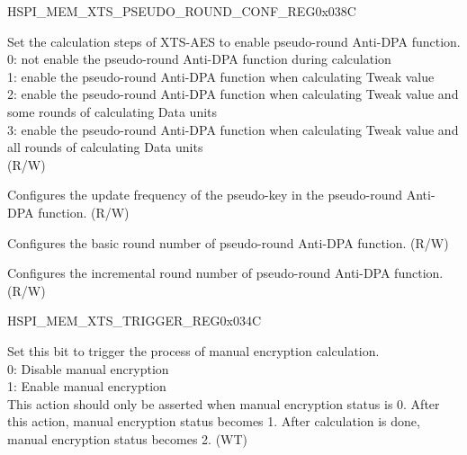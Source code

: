 \begin{register}{H}{SPI\_MEM\_XTS\_PSEUDO\_ROUND\_CONF\_REG}{0x038C}\label{regdesc:SPIMEMXTSPSEUDOROUNDCONFREG}
%
%
%
%
%
\regnewline%
\begin{regdesc}\begin{reglist}
\label{fielddesc:SPIMEMMODEPSEUDO}\item [SPI\_MEM\_MODE\_PSEUDO] Set the calculation steps of XTS-AES to enable pseudo-round Anti-DPA function. \\
0: not enable the pseudo-round Anti-DPA function during calculation\\
1: enable the pseudo-round Anti-DPA function when calculating Tweak value\\
2: enable the pseudo-round Anti-DPA function when calculating Tweak value and some rounds of calculating Data units\\
3: enable the pseudo-round Anti-DPA function when calculating Tweak value and all rounds of calculating Data units\\
(R/W)
\label{fielddesc:SPIMEMPSEUDORNGCNT}\item [SPI\_MEM\_PSEUDO\_RNG\_CNT] Configures the update frequency of the pseudo-key in the pseudo-round Anti-DPA function. (R/W)
\label{fielddesc:SPIMEMPSEUDOBASE}\item [SPI\_MEM\_PSEUDO\_BASE] Configures the basic round number of pseudo-round Anti-DPA function. (R/W)
\label{fielddesc:SPIMEMPSEUDOINC}\item [SPI\_MEM\_PSEUDO\_INC] Configures the incremental round number of pseudo-round Anti-DPA function. (R/W)
\end{reglist}\end{regdesc}
\end{register}

\begin{register}{H}{SPI\_MEM\_XTS\_TRIGGER\_REG}{0x034C}\label{regdesc:SPIMEMXTSTRIGGERREG}
%
%
\regnewline%
\begin{regdesc}\begin{reglist}
\label{fielddesc:SPIMEMXTSTRIGGER}\item [SPI\_MEM\_XTS\_TRIGGER] Set this bit to trigger the process of manual encryption calculation. \\
0: Disable manual encryption\\
1: Enable manual encryption\\
This action should only be asserted when manual encryption status is 0. After this action, manual encryption status becomes 1. After calculation is done, manual encryption status becomes 2. (WT)
\end{reglist}\end{regdesc}
\end{register}


